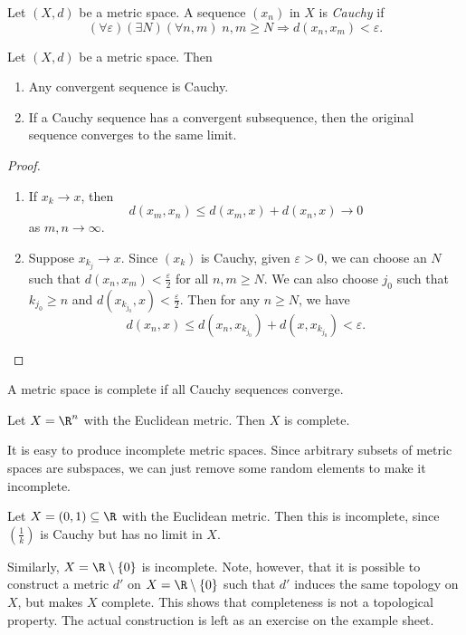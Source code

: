 \documentclass[a4paper]{article}
\begin{document}
\begin{defi}
  Let $(X, d)$ be a metric space. A sequence $(x_n)$ in $X$ is \emph{Cauchy} if
  \[
    (\forall \varepsilon)(\exists N)(\forall n, m)\; n, m \geq N \Rightarrow d(x_n, x_m) < \varepsilon.
  \]
\end{defi}

\begin{prop}
  Let $(X, d)$ be a metric space. Then
  \begin{enumerate}
    \item Any convergent sequence is Cauchy.
    \item If a Cauchy sequence has a convergent subsequence, then the original sequence converges to the same limit.
  \end{enumerate}
\end{prop}

\begin{proof}\leavevmode
  \begin{enumerate}
    \item If $x_k \to x$, then
      \[
        d(x_m, x_n) \leq d(x_m, x) + d(x_n, x) \to 0
      \]
      as $m, n \to \infty$.
    \item Suppose $x_{k_j} \to x$. Since $(x_k)$ is Cauchy, given $\varepsilon > 0$, we can choose an $N$ such that $d(x_n, x_m) < \frac{\varepsilon}{2}$ for all $n, m \geq N$. We can also choose $j_0$ such that $k_{j_0} \geq n$ and $d(x_{k_{j_0}}, x) < \frac{\varepsilon}{2}$. Then for any $n \geq N$, we have
      \[
        d(x_n, x) \leq d(x_n, x_{k_{j_0}}) + d(x, x_{k_{j_0}}) < \varepsilon.
      \]
  \end{enumerate}
\end{proof}

\begin{defi}
  A metric space is complete if all Cauchy sequences converge.
\end{defi}

\begin{eg}
  Let $X = \R^n$ with the Euclidean metric. Then $X$ is complete.
\end{eg}
It is easy to produce incomplete metric spaces. Since arbitrary subsets of metric spaces are subspaces, we can just remove some random elements to make it incomplete.

\begin{eg}
  Let $X = (0, 1) \subseteq \R$ with the Euclidean metric. Then this is incomplete, since $\left(\frac{1}{k}\right)$ is Cauchy but has no limit in $X$.

  Similarly, $X = \R \setminus \{0\}$ is incomplete. Note, however, that it is possible to construct a metric $d'$ on $X = \R \setminus \{0\}$ such that $d'$ induces the same topology on $X$, but makes $X$ complete. This shows that completeness is not a topological property. The actual construction is left as an exercise on the example sheet.
\end{eg}
\end{document}
